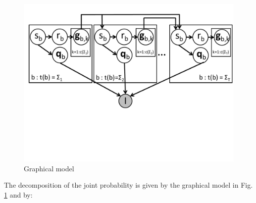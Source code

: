 \documentclass[11pt]{article}
\begin{document}
\begin{figure}[htbp]
\begin{center}
\includegraphics[width=\textwidth, trim=0cm 6cm 0cm 0cm]{gm.pdf}
\caption{Graphical model}
\label{gm}
\end{center}
\end{figure}

\FloatBarrier

The decomposition of the joint probability is given by the graphical model in Fig. \ref{gm} and by: \\
\end{document}
